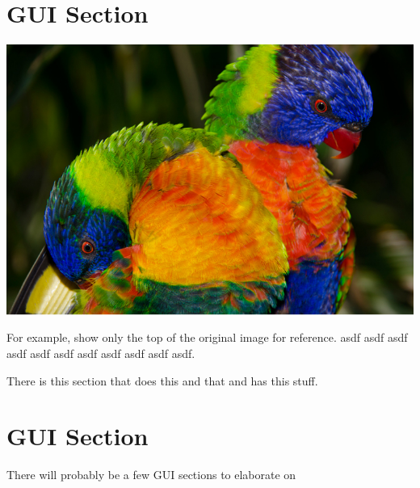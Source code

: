 \documentclass{scrreprt}
\begin{document}
\section{GUI Section}

\includegraphics[trim={0 10cm 0 0},clip,width=\textwidth]{sample}

For example, show only the top of the original image for reference. asdf asdf asdf
asdf asdf asdf asdf asdf asdf asdf asdf.

There is this section that does this and that and has this stuff.

\section{GUI Section}
There will probably be a few GUI sections to elaborate on
\end{document}
